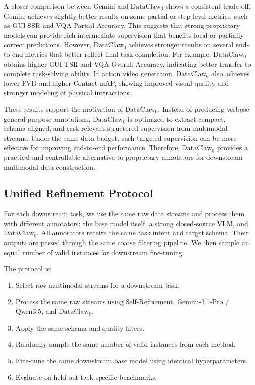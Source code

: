 A closer comparison between Gemini and $\text{DataClaw}_0$ shows a consistent trade-off. Gemini achieves slightly better results on some partial or step-level metrics, such as GUI SSR and VQA Partial Accuracy. This suggests that strong proprietary models can provide rich intermediate supervision that benefits local or partially correct predictions. However, $\text{DataClaw}_0$ achieves stronger results on several end-to-end metrics that better reflect final task completion. For example, $\text{DataClaw}_0$ obtains higher GUI TSR and VQA Overall Accuracy, indicating better transfer to complete task-solving ability. In action video generation, $\text{DataClaw}_0$ also achieves lower FVD and higher Contact mAP, showing improved visual quality and stronger modeling of physical interactions.

These results support the motivation of $\text{DataClaw}_0$. Instead of producing verbose general-purpose annotations, $\text{DataClaw}_0$ is optimized to extract compact, schema-aligned, and task-relevant structured supervision from multimodal streams. Under the same data budget, such targeted supervision can be more effective for improving end-to-end performance. Therefore, $\text{DataClaw}_0$ provides a practical and controllable alternative to proprietary annotators for downstream multimodal data construction.

\subsection{Unified Refinement Protocol}
\label{app:unified_downstream_protocol}

For each downstream task, we use the same raw data streams and process them with different annotators: the base model itself, a strong closed-source VLM, and $\text{DataClaw}_0$. All annotators receive the same task intent and target schema. Their outputs are passed through the same coarse filtering pipeline. We then sample an equal number of valid instances for downstream fine-tuning.

The protocol is:

\begin{enumerate}[leftmargin=*]
    \item Select raw multimodal streams for a downstream task.
    \item Process the same raw streams using Self-Refinement, Gemini-3.1-Pro / Qwen3.5, and $\text{DataClaw}_0$.
    \item Apply the same schema and quality filters.
    \item Randomly sample the same number of valid instances from each method.
    \item Fine-tune the same downstream base model using identical hyperparameters.
    \item Evaluate on held-out task-specific benchmarks.
\end{enumerate}

